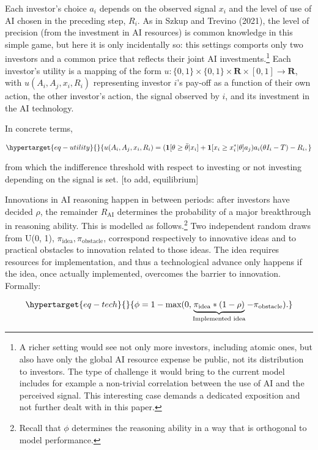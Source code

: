 \documentclass[
]{article}
\theoremstyle{plain}
\theoremstyle{remark}
\begin{document}
Each investor's choice \(a_i\) depends on the observed signal \(x_i\)
and the level of use of AI chosen in the preceding step, \(R_i\). As in
Szkup and Trevino (2021), the level of precision (from the investment in
AI resources) is common knowledge in this simple game, but here it is
only incidentally so: this settings comports only two investors and a
common price that reflects their joint AI investments.\footnote{A richer
  setting would see not only more investors, including atomic ones, but
  also have only the global AI resource expense be public, not its
  distribution to investors. The type of challenge it would bring to the
  current model includes for example a non-trivial correlation between
  the use of AI and the perceived signal. This interesting case demands
  a dedicated exposition and not further dealt with in this paper.} Each
investor's utility is a mapping of the form
\(u : \{0, 1\} \times \{0, 1\} \times \mathbf{R} \times [0, 1] \to \mathbf{R}\),
with \(u(A_i, A_j, x_i, R_i)\) representing investor \(i\)'s pay-off as
a function of their own action, the other investor's action, the signal
observed by \(i\), and its investment in the AI technology.

In concrete terms,

\begin{equation}\protect\hypertarget{eq-utility}{}{
u(A_i, A_j, x_i, R_i) = (\mathbf{1}[\theta \geq \bar{\theta}|x_i] + \mathbf{1}[x_i \geq x_i^*|\theta]a_j)a_i(\theta I_i - T) - R_i,
}\label{eq-utility}\end{equation}

from which the indifference threshold with respect to investing or not
investing depending on the signal is set. {[}to add, equilibrium{]}

Innovations in AI reasoning happen in between periods: after investors
have decided \(\rho\), the remainder \(R_{\text{AI}}\) determines the
probability of a major breakthrough in reasoning ability. This is
modelled as follows.\footnote{Recall that \(\phi\) determines the
  reasoning ability in a way that is orthogonal to model performance.}
Two independent random draws from U(0, 1),
\(\pi_{\text{idea}}, \pi_{\text{obstacle}}\), correspond respectively to
innovative ideas and to practical obstacles to innovation related to
those ideas. The idea requires resources for implementation, and thus a
technological advance only happens if the idea, once actually
implemented, overcomes the barrier to innovation. Formally:

\begin{equation}\protect\hypertarget{eq-tech}{}{
\phi = 1-\text{max}(0, \underbrace{\pi_{\text{idea}} * (1-\rho)}_{\text{Implemented idea}} - \pi_{\text{obstacle}}).
}\label{eq-tech}\end{equation}
\end{document}
